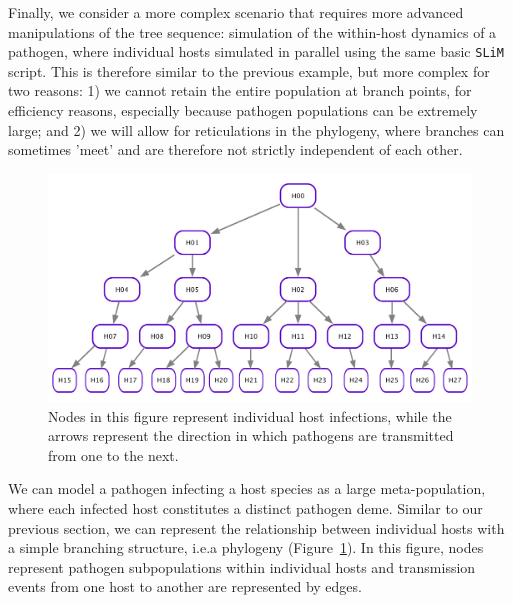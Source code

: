 \documentclass[12pt]{article}
\newcommand{\slim}[0]{\texttt{SLiM}\xspace}
\newcommand*{\ie}{i.e.\xcomma}
\begin{document}
Finally, we consider a more complex scenario that requires more advanced manipulations of the tree sequence:
simulation of the within-host dynamics of a pathogen,
where individual hosts simulated in parallel using the same basic \slim script.
This is therefore similar to the previous example, but more complex for two reasons:
1) we cannot retain the entire population at branch points, for efficiency reasons, especially because pathogen populations can be extremely large; and
2) we will allow for reticulations in the phylogeny, where branches can sometimes 'meet' and are therefore not strictly independent of each other.


\begin{figure}[h!]
    \centering
     \includegraphics[width=\textwidth]{figures/DAG_no_reticulation.pdf}
     \caption{
        Nodes in this figure represent individual host infections, while the arrows represent the direction in which pathogens are transmitted from one to the next. 
     \label{fig:DAG_no_reticulation}
     }
    \end{figure}

We can model a pathogen infecting a host species as a large meta-population, where each infected host constitutes a distinct pathogen deme.
Similar to our previous section, we can represent the relationship between individual hosts with a simple branching structure, \ie a phylogeny (Figure~\ref{fig:DAG_no_reticulation}).
In this figure, nodes represent pathogen subpopulations within individual hosts and transmission events from one host to another are represented by edges.
\end{document}
